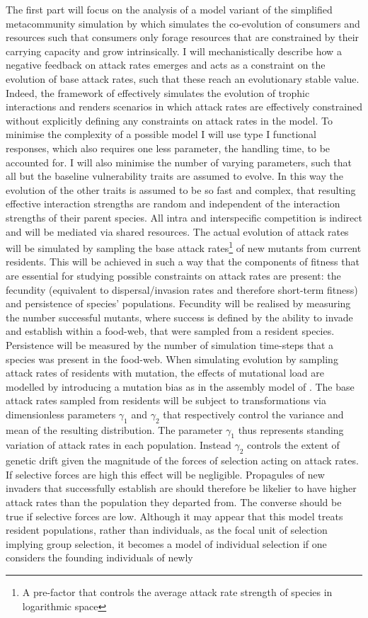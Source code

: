 \documentclass[a4paper]{report}
\begin{document}
The first part will focus on the analysis of a model variant of the simplified metacommunity simulation by \citep{Rossberg2008} which simulates the co-evolution of consumers and resources such that consumers only forage resources that are constrained by their carrying capacity and grow intrinsically. I will mechanistically describe how a negative feedback on attack rates emerges and acts as a constraint on the evolution of base attack rates, such that these reach an evolutionary stable value. Indeed, the framework of \citep{Rossberg2008} effectively simulates the evolution of trophic interactions and renders scenarios in which attack rates are effectively constrained without explicitly defining any constraints on attack rates in the model. To minimise the complexity of a possible model I will use type I functional responses, which also requires one less parameter, the handling time, to be accounted for. I will also minimise the number of varying parameters, such that all but the baseline vulnerability traits are assumed to evolve. In this way the evolution of the other traits is assumed to be so fast and complex, that resulting effective interaction strengths are random and independent of the interaction strengths of their parent species. All intra and interspecific competition is indirect and will be mediated via shared resources. The actual evolution of attack rates will be simulated by sampling the base attack rates\footnote{A pre-factor that controls the average attack rate strength of species in logarithmic space} of new mutants from current residents. This will be achieved in such a way that the components of fitness that are essential for studying possible constraints on attack rates are present: the fecundity (equivalent to dispersal/invasion rates and therefore short-term fitness) and persistence of species’ populations. Fecundity will be realised by measuring the number successful mutants, where success is defined by the ability to invade and establish within a food-web, that were sampled from a resident species. Persistence will be measured by the number of simulation time-steps that a species was present in the food-web. When simulating evolution by sampling attack rates of residents with mutation, the effects of mutational load are modelled by introducing a mutation bias as in the assembly model of \citep{Rossberg2008}. The base attack rates sampled from residents will be subject to transformations via dimensionless parameters $\gamma_1$ and $\gamma_2$ that respectively control the variance and mean of the resulting distribution. The parameter $\gamma_1$ thus represents standing variation of attack rates in each population. Instead $\gamma_2$ controls the extent of genetic drift given the magnitude of the forces of selection acting on attack rates. If selective forces are high this effect will be negligible. Propagules of new invaders that successfully establish are should therefore be likelier to have higher attack rates than the population they departed from. The converse should be true if selective forces are low. Although it may appear that this model treats resident populations, rather than individuals, as the focal unit of selection implying group selection, it becomes a model of individual selection if one considers the founding individuals of newly 
\end{document}
